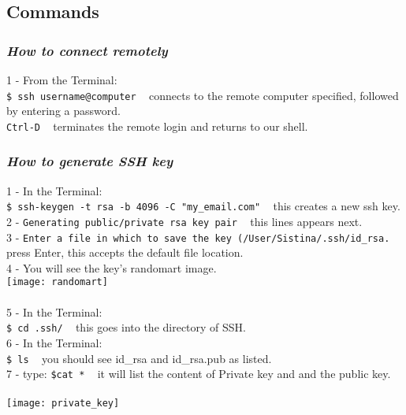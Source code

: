 \documentclass{article}
\begin{document}
{{{\subsection{Commands}
\subsubsection{\small\textsl{How to connect remotely}}
1 - From the Terminal:\\
\texttt{\$ ssh username@computer} ~ connects to the remote computer specified, followed by entering a password.\\
\texttt{Ctrl-D} ~ terminates the remote login and returns to our shell. \\
\subsubsection{\small\textsl{How to generate SSH key}}
1 - In the Terminal:\\
\texttt{\$ ssh-keygen -t rsa -b 4096 -C "my\_email\@address.com"} ~ this creates a new ssh key.\\
2 - \texttt{Generating public/private rsa key pair} ~ this lines appears next. \\
3 - \texttt{Enter a file in which to save the key (/User/Sistina/.ssh/id\_rsa.} ~ press Enter, this accepts the default file location.\\
4 - You will see the key's randomart image. \\
\texttt{[image: randomart]}\\
\\
5 - In the Terminal:\\
\texttt{\$ cd .ssh/} ~ this goes into the directory of SSH.\\
6 - In the Terminal: \\
\texttt{\$ ls} ~ you should see id\_rsa and id\_rsa.pub as listed.\\
7 - type:
\texttt{\$cat *} ~ it will list the content of Private key and and the public key.\\ 
\\
\texttt{[image: private\_key]}\\


\newpage
}}}
\end{document}
